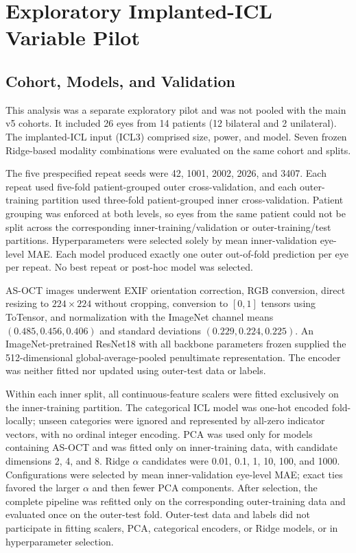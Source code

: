 \clearpage
\onecolumn
\section{Exploratory Implanted-ICL Variable Pilot}

\subsection{Cohort, Models, and Validation}

This analysis was a separate exploratory pilot and was not pooled with the main v5 cohorts. It included 26 eyes from 14 patients (12 bilateral and 2 unilateral). The implanted-ICL input (ICL3) comprised size, power, and model. Seven frozen Ridge-based modality combinations were evaluated on the same cohort and splits.

The five prespecified repeat seeds were 42, 1001, 2002, 2026, and 3407. Each repeat used five-fold patient-grouped outer cross-validation, and each outer-training partition used three-fold patient-grouped inner cross-validation. Patient grouping was enforced at both levels, so eyes from the same patient could not be split across the corresponding inner-training/validation or outer-training/test partitions. Hyperparameters were selected solely by mean inner-validation eye-level MAE. Each model produced exactly one outer out-of-fold prediction per eye per repeat. No best repeat or post-hoc model was selected.

AS-OCT images underwent EXIF orientation correction, RGB conversion, direct resizing to $224 \times 224$ without cropping, conversion to $[0,1]$ tensors using ToTensor, and normalization with the ImageNet channel means $(0.485, 0.456, 0.406)$ and standard deviations $(0.229, 0.224, 0.225)$. An ImageNet-pretrained ResNet18 with all backbone parameters frozen supplied the 512-dimensional global-average-pooled penultimate representation. The encoder was neither fitted nor updated using outer-test data or labels.

Within each inner split, all continuous-feature scalers were fitted exclusively on the inner-training partition. The categorical ICL model was one-hot encoded fold-locally; unseen categories were ignored and represented by all-zero indicator vectors, with no ordinal integer encoding. PCA was used only for models containing AS-OCT and was fitted only on inner-training data, with candidate dimensions 2, 4, and 8. Ridge $\alpha$ candidates were 0.01, 0.1, 1, 10, 100, and 1000. Configurations were selected by mean inner-validation eye-level MAE; exact ties favored the larger $\alpha$ and then fewer PCA components. After selection, the complete pipeline was refitted only on the corresponding outer-training data and evaluated once on the outer-test fold. Outer-test data and labels did not participate in fitting scalers, PCA, categorical encoders, or Ridge models, or in hyperparameter selection.

